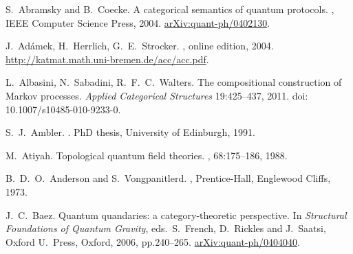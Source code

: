 \begin{thebibliography}{RSW00}

    S.\ Abramsky and B.\ Coecke.
    \newblock A categorical semantics of quantum protocols.
    , IEEE Computer Science Press, 2004.
    \newblock \href{http://arxiv.org/abs/quant-ph/0402130}{arXiv:quant-ph/0402130}.

    J.\ Ad\'amek, H.\ Herrlich, G.\ E.\ Strocker. 
    , online
    edition, 2004.
    \newblock
    \href{http://katmat.math.uni-bremen.de/acc/acc.pdf}{http://katmat.math.uni-bremen.de/acc/acc.pdf}.



    L.\ Albasini, N.\ Sabadini, R.\ F.\ C.\ Walters. 
    \newblock The compositional construction of Markov processes.
    \newblock \emph{Applied Categorical Structures} { 19}:425--437, 2011. 
    \newblock doi: 10.1007/s10485-010-9233-0.

    S.\ J.\ Ambler. 
    . 
    \newblock PhD thesis, University of Edinburgh, 1991.



     M.\ Atiyah. 
    \newblock Topological quantum field theories.
    , 68:175--186, 1988. 

    B.\ D.\ O.\ Anderson and S.\ Vongpanitlerd. 
    , Prentice-Hall, Englewood Cliffs, 1973.

    J.\ C.\ Baez. 
    \newblock Quantum quandaries: a category-theoretic
    perspective. 
    \newblock In {\sl Structural Foundations of Quantum Gravity}, eds.\
    S.\ French, D.\ Rickles and J.\ Saatsi, Oxford U.\ Press, Oxford,
    2006, pp.240--265. 
    \newblock \href{http://arxiv.org/abs/quant-ph/0404040}
    {arXiv:quant-ph/0404040}.


\end{thebibliography}

